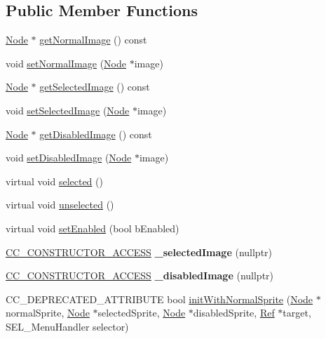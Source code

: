 \subsection*{Public Member Functions}
\begin{DoxyCompactItemize}
\item 
\hyperlink{classNode}{Node} $\ast$ \hyperlink{classMenuItemSprite_a58e62e7a8c9255d7dddaf1e868637aa3}{get\+Normal\+Image} () const
\item 
void \hyperlink{classMenuItemSprite_a27ddb3eec072386e1e34034c185a3b45}{set\+Normal\+Image} (\hyperlink{classNode}{Node} $\ast$image)
\item 
\hyperlink{classNode}{Node} $\ast$ \hyperlink{classMenuItemSprite_ae5a5bdcfe21ab32a531633ea2c4275a1}{get\+Selected\+Image} () const
\item 
void \hyperlink{classMenuItemSprite_adc05f4e00100f4d526786709b9294ad6}{set\+Selected\+Image} (\hyperlink{classNode}{Node} $\ast$image)
\item 
\hyperlink{classNode}{Node} $\ast$ \hyperlink{classMenuItemSprite_a9db9e0e79bfc17d27f697a69b023b0c5}{get\+Disabled\+Image} () const
\item 
void \hyperlink{classMenuItemSprite_ac93922466d23b5ae32c6da4ccb4bdd62}{set\+Disabled\+Image} (\hyperlink{classNode}{Node} $\ast$image)
\item 
virtual void \hyperlink{classMenuItemSprite_a668b5d916cb926e161cc7ebdf96364e6}{selected} ()
\item 
virtual void \hyperlink{classMenuItemSprite_abdc49b1b264349807eae52aa96472abf}{unselected} ()
\item 
virtual void \hyperlink{classMenuItemSprite_a09946218901edb83c5ba363d1029b61d}{set\+Enabled} (bool b\+Enabled)
\item 
\mbox{\label{classMenuItemSprite_ac5ffc0f3fea363ca5783759ac346b9cc}} 
\hyperlink{_2cocos2d_2cocos_2base_2ccConfig_8h_a25ef1314f97c35a2ed3d029b0ead6da0}{C\+C\+\_\+\+C\+O\+N\+S\+T\+R\+U\+C\+T\+O\+R\+\_\+\+A\+C\+C\+E\+SS} {\bfseries \+\_\+selected\+Image} (nullptr)
\item 
\mbox{\label{classMenuItemSprite_af79057c9ff34d0baf272ad6399e0a578}} 
\hyperlink{_2cocos2d_2cocos_2base_2ccConfig_8h_a25ef1314f97c35a2ed3d029b0ead6da0}{C\+C\+\_\+\+C\+O\+N\+S\+T\+R\+U\+C\+T\+O\+R\+\_\+\+A\+C\+C\+E\+SS} {\bfseries \+\_\+disabled\+Image} (nullptr)
\item 
C\+C\+\_\+\+D\+E\+P\+R\+E\+C\+A\+T\+E\+D\+\_\+\+A\+T\+T\+R\+I\+B\+U\+TE bool \hyperlink{classMenuItemSprite_ae69d347fb65cc123efd80161767280ec}{init\+With\+Normal\+Sprite} (\hyperlink{classNode}{Node} $\ast$normal\+Sprite, \hyperlink{classNode}{Node} $\ast$selected\+Sprite, \hyperlink{classNode}{Node} $\ast$disabled\+Sprite, \hyperlink{classRef}{Ref} $\ast$target, S\+E\+L\+\_\+\+Menu\+Handler selector)

\end{DoxyCompactItemize}
